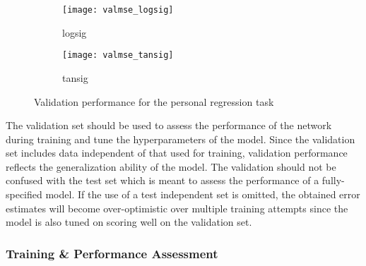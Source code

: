 \documentclass[conference,compsoc]{IEEEtran}
\begin{document}
      \begin{figure*}[]
        \centering
        \begin{subfigure}{0.33\linewidth}
            \texttt{[image: valmse\_logsig]}
            \caption{logsig}
        \end{subfigure}
        \begin{subfigure}{0.33\linewidth}
            \texttt{[image: valmse\_tansig]}
            \caption{tansig}
        \end{subfigure}
        
        \caption{Validation performance for the personal regression task}
        \label{fig:regsum}
\end{figure*}



The validation set should be used to assess the performance of the network during training and tune the hyperparameters of the model. Since the validation set includes data independent of that used for training, validation  performance reflects the generalization ability of the model.  The validation should not be confused with the test set which is meant to assess the performance of a fully-specified model.  If the use of a test independent set is omitted, the obtained error estimates will become over-optimistic over multiple training attempts since the model is also tuned on scoring well on the validation set.



\subsubsection{Training \& Performance Assessment}
 
% 
\end{document}
